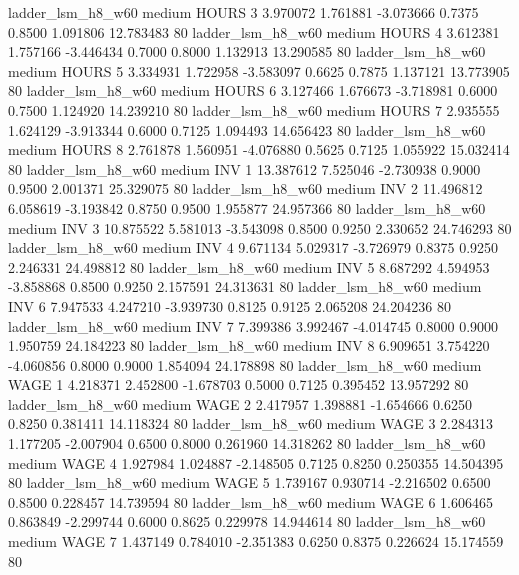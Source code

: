      ladder_lsm_h8_w60     medium    HOURS                 3  3.970072 1.761881 -3.073666 0.7375 0.8500  1.091806   12.783483 80
     ladder_lsm_h8_w60     medium    HOURS                 4  3.612381 1.757166 -3.446434 0.7000 0.8000  1.132913   13.290585 80
     ladder_lsm_h8_w60     medium    HOURS                 5  3.334931 1.722958 -3.583097 0.6625 0.7875  1.137121   13.773905 80
     ladder_lsm_h8_w60     medium    HOURS                 6  3.127466 1.676673 -3.718981 0.6000 0.7500  1.124920   14.239210 80
     ladder_lsm_h8_w60     medium    HOURS                 7  2.935555 1.624129 -3.913344 0.6000 0.7125  1.094493   14.656423 80
     ladder_lsm_h8_w60     medium    HOURS                 8  2.761878 1.560951 -4.076880 0.5625 0.7125  1.055922   15.032414 80
     ladder_lsm_h8_w60     medium      INV                 1 13.387612 7.525046 -2.730938 0.9000 0.9500  2.001371   25.329075 80
     ladder_lsm_h8_w60     medium      INV                 2 11.496812 6.058619 -3.193842 0.8750 0.9500  1.955877   24.957366 80
     ladder_lsm_h8_w60     medium      INV                 3 10.875522 5.581013 -3.543098 0.8500 0.9250  2.330652   24.746293 80
     ladder_lsm_h8_w60     medium      INV                 4  9.671134 5.029317 -3.726979 0.8375 0.9250  2.246331   24.498812 80
     ladder_lsm_h8_w60     medium      INV                 5  8.687292 4.594953 -3.858868 0.8500 0.9250  2.157591   24.313631 80
     ladder_lsm_h8_w60     medium      INV                 6  7.947533 4.247210 -3.939730 0.8125 0.9125  2.065208   24.204236 80
     ladder_lsm_h8_w60     medium      INV                 7  7.399386 3.992467 -4.014745 0.8000 0.9000  1.950759   24.184223 80
     ladder_lsm_h8_w60     medium      INV                 8  6.909651 3.754220 -4.060856 0.8000 0.9000  1.854094   24.178898 80
     ladder_lsm_h8_w60     medium     WAGE                 1  4.218371 2.452800 -1.678703 0.5000 0.7125  0.395452   13.957292 80
     ladder_lsm_h8_w60     medium     WAGE                 2  2.417957 1.398881 -1.654666 0.6250 0.8250  0.381411   14.118324 80
     ladder_lsm_h8_w60     medium     WAGE                 3  2.284313 1.177205 -2.007904 0.6500 0.8000  0.261960   14.318262 80
     ladder_lsm_h8_w60     medium     WAGE                 4  1.927984 1.024887 -2.148505 0.7125 0.8250  0.250355   14.504395 80
     ladder_lsm_h8_w60     medium     WAGE                 5  1.739167 0.930714 -2.216502 0.6500 0.8500  0.228457   14.739594 80
     ladder_lsm_h8_w60     medium     WAGE                 6  1.606465 0.863849 -2.299744 0.6000 0.8625  0.229978   14.944614 80
     ladder_lsm_h8_w60     medium     WAGE                 7  1.437149 0.784010 -2.351383 0.6250 0.8375  0.226624   15.174559 80
